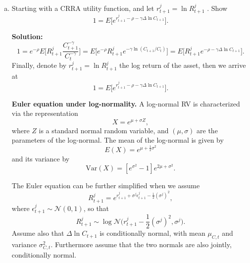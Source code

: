 \documentclass[11pt]{extarticle}
\theoremstyle{plain}
\theoremstyle{definition}
\begin{document}
\begin{enumerate}[(a)]
\item Starting with a CRRA utility function, and let $r_{t+1}^j = \ln R_{t+1}^j$ . Show 
\begin{equation*}
	1 = E\bigg[ e^{r_{t+1}^j - \rho -\gamma \Delta \ln  C_{t+1}} \bigg].
\end{equation*}



\textbf{Solution:}
\begin{equation*}
	1 = e^{-\rho} E\bigg[R_{t+1}^j \frac{C_{t+1}^{-\gamma}}{C_t^{-\gamma}} \bigg] = E\bigg[e^{-\rho}  R_{t+1}^j e^{-\gamma \ln(C_{t+1} / C_t)} \bigg] = E\bigg[ R_{t+1}^j e^{- \rho -\gamma  \Delta \ln  C_{t+1}} \bigg].
\end{equation*}
Finally, denote by $r_{t+1}^j = \ln R_{t+1}^j$ the log return of the asset, then we arrive at 
\begin{equation*}
	1 = E\bigg[ e^{r_{t+1}^j - \rho -\gamma \Delta \ln  C_{t+1}} \bigg].
\end{equation*}


\vspace{5mm}
\noindent
\textbf{Euler equation under log-normality.} A log-normal RV is characterized via the representation
\begin{equation*}
	X = e^{\mu + \sigma Z},
\end{equation*}
where $Z$ is a standard normal random variable, and $(\mu,\sigma)$ are the parameters of the log-normal. The mean of the log-normal is given by
\begin{equation*}
	E(X) = e^{\mu + \frac{1}{2} \sigma^2}
\end{equation*}
and its variance by
\begin{equation*}
	\text{Var}(X) = [e^{\sigma^2}-1] e^{2\mu + \sigma^2}.
\end{equation*}


The Euler equation can be further simplified when we assume
\begin{equation*}
	R_{t+1}^j = e^{r_{t+1}^j + \sigma^j \epsilon_{t+1}^j - \frac{1}{2} (\sigma^j)^2},
\end{equation*}
where $\epsilon_{t+1}^j \sim \mathcal{N}(0,1)$, so that 
\begin{equation*}
	R_{t+1}^j  \sim \log \mathcal{N} \bigg(r_{t+1}^j - \frac{1}{2} (\sigma^j)^2, \sigma^j\bigg).
\end{equation*}
Assume also that $\Delta \ln  C_{t+1}$ is conditionally normal, with mean $\mu_{C,t}$ and variance $\sigma_{C,t}^2$. Furthermore assume that the two normals are also jointly, conditionally normal.


\end{enumerate}
\end{document}

